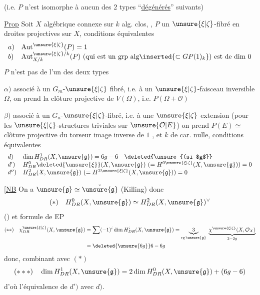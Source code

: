 (i.e. $P$ n'est isomorphe à aucun des $2$ types ``\uline{dégénérés}'' suivants\unsure{\ldots\ldots})

\uline{Prop} Soit $X$  algébrique connexe sur $k$ alg. clos, , $P$ un $\unsure{\xi|\zeta}$-fibré en droites projectives sur $X$, conditions équivalentes
\[
\begin{array}{ll}
a)&\operatorname{Aut}^{\unsure{\xi|\zeta}}(P)=1\\
b)&\operatorname{Aut}^{\unsure{\xi|\zeta}/k}_{X/k}(P)\text{ (qui est un grp alg}\inserted{\subset GP(1)_k}\text{) est de dim }0
\end{array}
\]
 $P$ n'est pas de l'un des deux types

$\alpha)$ associé à un $G_m$-$\unsure{\xi|\zeta}$ fibré, i.e. à un $\unsure{\xi|\zeta}$-faisceau inversible $\Omega$, on prend la clôture projective de $V(\Omega)$, i.e. $P(\Omega+\mathcal O)$

$\beta)$ associé à un $G_a$-$\unsure{\xi|\zeta}$-fibré, i.e. à une $\unsure{\xi|\zeta}$ extension
(pour les $\unsure{\xi|\zeta}$-structures triviales sur $\unsure{\mathcal O|E}$) on prend $P(E)\simeq$ clôture projective du torseur image inverse de $1$
, et $k$ de car. nulle, conditions équivalentes
\[
\begin{array}{ll}
d)&\dim H^1_{DR}(X,\unsure{\mathfrak g})=6g-6\quad\deleted{\unsure{(si $g$}}\\
d')&H^0_{DR}\deleted{\unsure{\xi}}(X,\unsure{\mathfrak g})\ (=H^{0\unsure{\xi|\zeta}}(X,\unsure{\mathfrak g}))=0\\
d'')&H^2_{DR}(X,\unsure{\mathfrak g})\ (=H^{2\unsure{\xi|\zeta}}(X,\unsure{\mathfrak g}))=0
\end{array}
\]

[\uline{NB} On a $\unsure{\mathfrak g}\simeq\check{\unsure{\mathfrak g}}$ (Killing) donc
\[
(*)\quad H^0_{DR}(X,\unsure{\mathfrak g})\simeq H^2_{DR}(X,\unsure{\mathfrak g})^\vee
\]
() et formule de EP
\[
\begin{aligned}
(**)\quad\chi^{\unsure{\xi|\zeta}}_{DR}(X,\unsure{\mathfrak g})
&=\sum(-1)^i\dim H^i_{DR}(X,\unsure{\mathfrak g})
=\underbrace{3}_{\operatorname{rg}\unsure{\mathfrak g}}\ \underbrace{\chi^{\unsure{\xi|\zeta}}(X,\mathcal O_X)}_{2-2g}\\
&=\deleted{\unsure{6g}}6-6g
\end{aligned}
\]
donc, combinant avec $(*)$
\[
(***)\quad \dim H^1_{DR}(X,\unsure{\mathfrak g})=2\dim H^0_{DR}(X,\unsure{\mathfrak g})+(6g-6)
\]
d'où l'équivalence de $d')$ avec $d)$.

